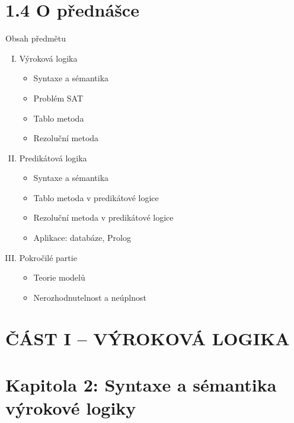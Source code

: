 \documentclass{beamer}
\begin{document}
\section{1.4 O přednášce}


\begin{frame}{Obsah předmětu}

    \begin{enumerate}[I.]
        \item Výroková logika
        \begin{itemize}
            \item Syntaxe a sémantika
            \item Problém SAT
            \item Tablo metoda
            \item Rezoluční metoda
        \end{itemize}
        \item Predikátová logika
        \begin{itemize}
            \item Syntaxe a sémantika
            \item Tablo metoda v predikátové logice
            \item Rezoluční metoda v predikátové logice
            \item Aplikace: databáze, Prolog
        \end{itemize}
        \item Pokročilé partie
        \begin{itemize}
            \item Teorie modelů
            \item Nerozhodnutelnost a neúplnost
        \end{itemize}
    \end{enumerate}    

\end{frame}


\section{ČÁST I -- VÝROKOVÁ LOGIKA}


\section{\sc Kapitola 2: Syntaxe a sémantika výrokové logiky}
\end{document}
